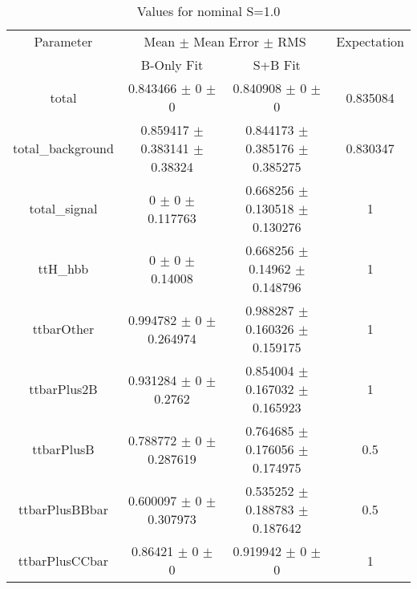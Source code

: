 \begin{table}
\centering
\caption{Values for nominal S=1.0}
\begin{tabular}{cccc}
\toprule
Parameter & \multicolumn{2}{c}{Mean $\pm$ Mean Error $\pm$ RMS} & Expectation\\
 & B-Only Fit & S+B Fit & \\
\midrule
total & \num{0.843466} $\pm$ \num{0} $\pm$ \num{0} & \num{0.840908} $\pm$ \num{0} $\pm$ \num{0} & \num{0.835084}\\
total\_background & \num{0.859417} $\pm$ \num{0.383141} $\pm$ \num{0.38324} & \num{0.844173} $\pm$ \num{0.385176} $\pm$ \num{0.385275} & \num{0.830347}\\
total\_signal & \num{0} $\pm$ \num{0} $\pm$ \num{0.117763} & \num{0.668256} $\pm$ \num{0.130518} $\pm$ \num{0.130276} & \num{1}\\
ttH\_hbb & \num{0} $\pm$ \num{0} $\pm$ \num{0.14008} & \num{0.668256} $\pm$ \num{0.14962} $\pm$ \num{0.148796} & \num{1}\\
ttbarOther & \num{0.994782} $\pm$ \num{0} $\pm$ \num{0.264974} & \num{0.988287} $\pm$ \num{0.160326} $\pm$ \num{0.159175} & \num{1}\\
ttbarPlus2B & \num{0.931284} $\pm$ \num{0} $\pm$ \num{0.2762} & \num{0.854004} $\pm$ \num{0.167032} $\pm$ \num{0.165923} & \num{1}\\
ttbarPlusB & \num{0.788772} $\pm$ \num{0} $\pm$ \num{0.287619} & \num{0.764685} $\pm$ \num{0.176056} $\pm$ \num{0.174975} & \num{0.5}\\
ttbarPlusBBbar & \num{0.600097} $\pm$ \num{0} $\pm$ \num{0.307973} & \num{0.535252} $\pm$ \num{0.188783} $\pm$ \num{0.187642} & \num{0.5}\\
ttbarPlusCCbar & \num{0.86421} $\pm$ \num{0} $\pm$ \num{0} & \num{0.919942} $\pm$ \num{0} $\pm$ \num{0} & \num{1}\\
\bottomrule
\end{tabular}
\end{table}